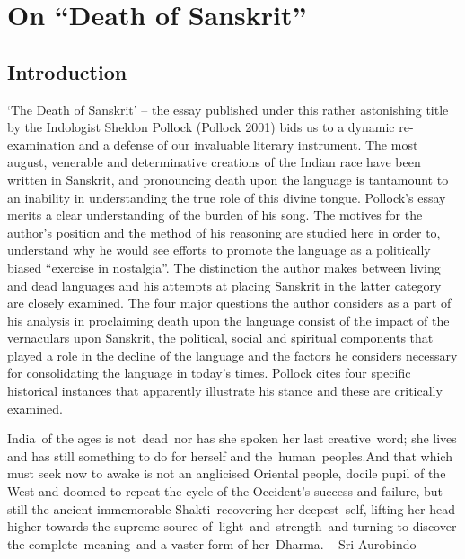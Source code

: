 \chapter{On “Death of Sanskrit”}\label{chapter8}


\section*{Introduction}

‘The Death of Sanskrit’ – the essay published under this rather astonishing title by the Indologist Sheldon Pollock (Pollock 2001) bids us to a dynamic re-examination and a defense of our invaluable literary instrument. The most august, venerable and determinative creations of the Indian race have been written in Sanskrit, and pronouncing death upon the language is tantamount to an inability in understanding the true role of this divine tongue. Pollock’s essay merits a clear understanding of the burden of his song. The motives for the author’s position and the method of his reasoning are studied here in order to, understand why he would see efforts to promote the language as a politically biased “exercise in nostalgia”. The distinction the author makes between living and dead languages and his attempts at placing Sanskrit in the latter category are closely examined.  The four major questions the author considers as a part of his analysis in proclaiming death upon the language consist of the impact of the vernaculars upon Sanskrit, the political, social and spiritual components that played a role in the decline of the language and the factors he considers necessary for consolidating the language in today’s times. Pollock cites four specific historical instances that apparently illustrate his stance and these are critically examined.
\newpage

\begin{myquote}
India of the ages is not dead nor has she spoken her last creative word; she lives and has still something to do for herself and the human peoples.\break And that which must seek now to awake is not an anglicised Oriental people, docile pupil of the West and doomed to repeat the cycle of the Occident's success and failure, but still the ancient immemorable  Shakti recovering her deepest self, lifting her head higher towards the supreme source of light and strength and turning to discover the complete meaning and a vaster form of her Dharma. \hfill– Sri Aurobindo
\end{myquote} 

